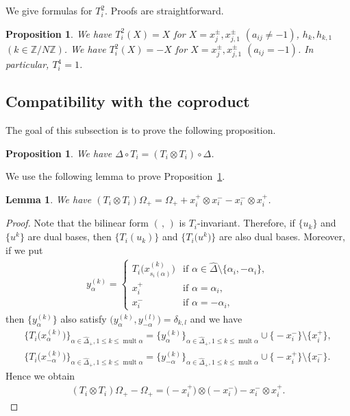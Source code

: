 \documentclass[pdftex]{sigma}
\newtheorem{prop}[thm]{Proposition}
\newtheorem{lem}[thm]{Lemma}
\theoremstyle{definition}
\numberwithin{equation}{section}
\DeclareMathOperator{\mult}{mult}
\newcommand{\bbZ}{\mathbb{Z}}
\begin{document}
We give formulas for $T_i^2$. Proofs are straightforward.
\begin{prop} We have $T_i^2(X)=X$ for $X=x_{j}^{\pm}, x_{j,1}^{\pm}$ $(a_{ij} \neq -1)$, $h_k, h_{k,1}$ $(k \in \bbZ/N\bbZ)$. We have $T_i^2(X)=-X$ for $X=x_{j}^{\pm}, x_{j,1}^{\pm}$ $(a_{ij} = -1)$. In particular, $T_i^4 = 1$.
\end{prop}

\subsection{Compatibility with the coproduct}\label{subsec:compatibility_coproduct}

The goal of this subsection is to prove the following proposition.
\begin{prop}\label{prop:compatibility_coproduct}We have $\Delta \circ T_i = (T_i \otimes T_i) \circ \Delta$.
\end{prop}

We use the following lemma to prove Proposition~\ref{prop:compatibility_coproduct}.

\begin{lem}\label{lem:Omega}We have $(T_i \otimes T_i)\Omega_+ = \Omega_+ + x_i^+ \otimes x_i^- - x_i^- \otimes x_i^+$.
\end{lem}
\begin{proof}Note that the bilinear form $(\, ,\, )$ is $T_i$-invariant. Therefore, if $\{u_k\}$ and $\big\{u^k\big\}$ are dual bases, then $\{T_i(u_k)\}$ and $\big\{T_i\big(u^k\big)\big\}$ are also dual bases. Moreover, if we put
\begin{gather*}
y_{\alpha}^{(k)} = \begin{cases}
T_i\big(x_{s_i(\alpha)}^{(k)}\big) & \text{if $\alpha \in \hat{\Delta} \setminus \{\alpha_i, -\alpha_i\}$},\\
x_i^+ & \text{if $\alpha = \alpha_i$},\\
x_i^- & \text{if $\alpha = -\alpha_i$},
\end{cases}
\end{gather*}
then $\big\{ y_{\alpha}^{(k)} \big\}$ also satisfy $\big(y_{\alpha}^{(k)}, y_{-\alpha}^{(l)}\big) = \delta_{k,l}$ and we have
\begin{gather*}
\big\{ T_i \big(x_{\alpha}^{(k)}\big) \big\}_{\alpha \in \hat{\Delta}_+, 1 \leq k \leq \mult \alpha} = \big\{y_\alpha^{(k)}\big\}_{\alpha \in \hat{\Delta}_+, 1 \leq k \leq \mult \alpha} \cup \big\{{-}x_i^-\big\} \setminus \big\{x_i^+\big\},\\
\big\{ T_i \big(x_{-\alpha}^{(k)}\big) \big\}_{\alpha \in \hat{\Delta}_+, 1 \leq k \leq \mult \alpha} = \big\{y_{-\alpha}^{(k)}\big\}_{\alpha \in \hat{\Delta}_+, 1 \leq k \leq \mult \alpha} \cup \big\{{-}x_i^+\big\} \setminus \big\{x_i^-\big\}.
\end{gather*}
Hence we obtain
\begin{gather*}
(T_i \otimes T_i)\Omega_+ - \Omega_+ = \big({-}x_i^+\big) \otimes \big({-}x_i^-\big) - x_i^- \otimes x_i^+.\tag*{\qed}
\end{gather*}\renewcommand{\qed}{}
\end{proof}
\end{document}
